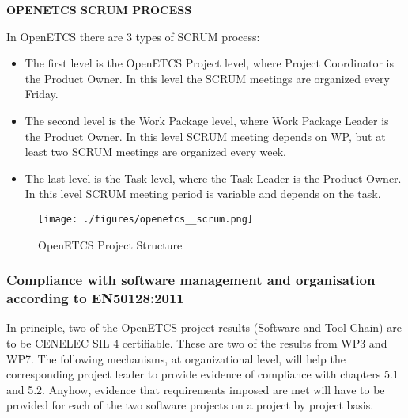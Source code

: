 \documentclass{template/openetcs_article}
\begin{document}
\textbf{OPENETCS SCRUM PROCESS}

In OpenETCS there are 3 types of SCRUM process:
\begin{itemize}
\item The first level is the OpenETCS Project level, where Project Coordinator is the Product Owner. In this level the SCRUM meetings are organized every Friday.
\item The second level is the Work Package level, where Work Package Leader is the Product Owner. In this level SCRUM meeting depends on WP, but at least two SCRUM meetings are organized every week.
\item The last level is the Task level, where the Task Leader is the Product Owner. In this level SCRUM meeting period is variable and depends on the task.
\end{itemize}

\begin{figure}[H]
\centering
\texttt{[image: ./figures/openetcs\_\_scrum.png]}
\caption{OpenETCS Project Structure}
\end{figure}

\subsubsection{Compliance with software management and organisation according to EN50128:2011}
In principle, two of the OpenETCS project results (Software and Tool Chain) are to be CENELEC \gls{SIL} 4 certifiable. These are two of the results from WP3 and WP7. The following mechanisms, at organizational level, will help the corresponding project leader to provide evidence of compliance with chapters 5.1 and 5.2. Anyhow, evidence that requirements imposed are met will have to be provided for each of the two software projects on a project by project basis. 
\end{document}
